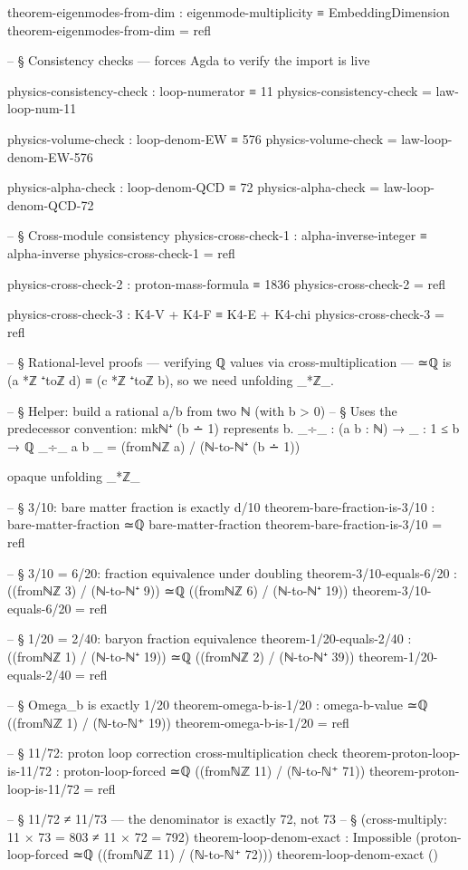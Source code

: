 \documentclass[11pt,a4paper]{book}
\begin{document}
\begin{code}
theorem-eigenmodes-from-dim : eigenmode-multiplicity ≡ EmbeddingDimension
theorem-eigenmodes-from-dim = refl

-- § Consistency checks — forces Agda to verify the import is live

physics-consistency-check : loop-numerator ≡ 11
physics-consistency-check = law-loop-num-11

physics-volume-check : loop-denom-EW ≡ 576
physics-volume-check = law-loop-denom-EW-576

physics-alpha-check : loop-denom-QCD ≡ 72
physics-alpha-check = law-loop-denom-QCD-72

-- § Cross-module consistency
physics-cross-check-1 : alpha-inverse-integer ≡ alpha-inverse
physics-cross-check-1 = refl

physics-cross-check-2 : proton-mass-formula ≡ 1836
physics-cross-check-2 = refl

physics-cross-check-3 : K4-V + K4-F ≡ K4-E + K4-chi
physics-cross-check-3 = refl

-- § Rational-level proofs — verifying ℚ values via cross-multiplication — ≃ℚ is (a *ℤ ⁺toℤ d) ≡ (c *ℤ ⁺toℤ b), so we need unfolding _*ℤ_.

-- § Helper: build a rational a/b from two ℕ (with b > 0)
-- § Uses the predecessor convention: mkℕ⁺ (b ∸ 1) represents b.
_÷_ : (a b : ℕ) → {_ : 1 ≤ b} → ℚ
_÷_ a b {_} = (fromℕℤ a) / (ℕ-to-ℕ⁺ (b ∸ 1))

opaque
  unfolding _*ℤ_

  -- § 3/10: bare matter fraction is exactly d/10
  theorem-bare-fraction-is-3/10 : bare-matter-fraction ≃ℚ bare-matter-fraction
  theorem-bare-fraction-is-3/10 = refl

  -- § 3/10 = 6/20: fraction equivalence under doubling
  theorem-3/10-equals-6/20 :
    ((fromℕℤ 3) / (ℕ-to-ℕ⁺ 9)) ≃ℚ ((fromℕℤ 6) / (ℕ-to-ℕ⁺ 19))
  theorem-3/10-equals-6/20 = refl

  -- § 1/20 = 2/40: baryon fraction equivalence
  theorem-1/20-equals-2/40 :
    ((fromℕℤ 1) / (ℕ-to-ℕ⁺ 19)) ≃ℚ ((fromℕℤ 2) / (ℕ-to-ℕ⁺ 39))
  theorem-1/20-equals-2/40 = refl

  -- § Omega_b is exactly 1/20
  theorem-omega-b-is-1/20 : omega-b-value ≃ℚ ((fromℕℤ 1) / (ℕ-to-ℕ⁺ 19))
  theorem-omega-b-is-1/20 = refl

  -- § 11/72: proton loop correction cross-multiplication check
  theorem-proton-loop-is-11/72 :
    proton-loop-forced ≃ℚ ((fromℕℤ 11) / (ℕ-to-ℕ⁺ 71))
  theorem-proton-loop-is-11/72 = refl

  -- § 11/72 ≠ 11/73 — the denominator is exactly 72, not 73
  -- § (cross-multiply: 11 × 73 = 803 ≠ 11 × 72 = 792)
  theorem-loop-denom-exact : Impossible (proton-loop-forced ≃ℚ ((fromℕℤ 11) / (ℕ-to-ℕ⁺ 72)))
  theorem-loop-denom-exact ()


\end{code}
\end{document}
